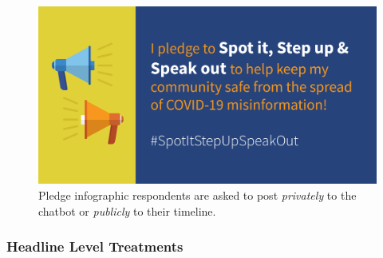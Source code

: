\documentclass[letterpaper, 12pt, parskip=full,]{scrartcl}
\begin{document}
\begin{enumerate}
\begin{figure}[htb]
\centering
\includegraphics[width=.5\textwidth]{pledge_image.png}
\caption{Pledge infographic respondents are asked to post \textit{privately} to the chatbot or \textit{publicly} to their timeline.}
\end{figure}

\end{enumerate}

\subsubsection{Headline Level Treatments}
\end{document}
